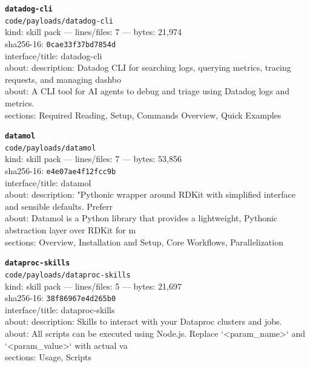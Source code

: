 \noindent\textbf{\texttt{datadog-cli}}\\
\texttt{code/payloads/datadog-cli}\\
kind: skill pack --- lines/files: 7 --- bytes: 21,974\\
sha256-16: \texttt{0cae33f37bd7854d}\\
interface/title: datadog-cli\\
about: description: Datadog CLI for searching logs, querying metrics, tracing requests, and managing dashbo\\
about: A CLI tool for AI agents to debug and triage using Datadog logs and metrics.\\
sections: Required Reading, Setup, Commands Overview, Quick Examples\\
\vspace*{6.0pt}

\noindent\textbf{\texttt{datamol}}\\
\texttt{code/payloads/datamol}\\
kind: skill pack --- lines/files: 7 --- bytes: 53,856\\
sha256-16: \texttt{e4e07ae4f12fcc9b}\\
interface/title: datamol\\
about: description: "Pythonic wrapper around RDKit with simplified interface and sensible defaults. Preferr\\
about: Datamol is a Python library that provides a lightweight, Pythonic abstraction layer over RDKit for m\\
sections: Overview, Installation and Setup, Core Workflows, Parallelization\\
\vspace*{6.0pt}
\newpage

\noindent\textbf{\texttt{dataproc-skills}}\\
\texttt{code/payloads/dataproc-skills}\\
kind: skill pack --- lines/files: 5 --- bytes: 21,697\\
sha256-16: \texttt{38f86967e4d265b0}\\
interface/title: dataproc-skills\\
about: description: Skills to interact with your Dataproc clusters and jobs.\\
about: All scripts can be executed using Node.js. Replace `<param\_name>` and `<param\_value>` with actual va\\
sections: Usage, Scripts\\
\vspace*{6.0pt}

